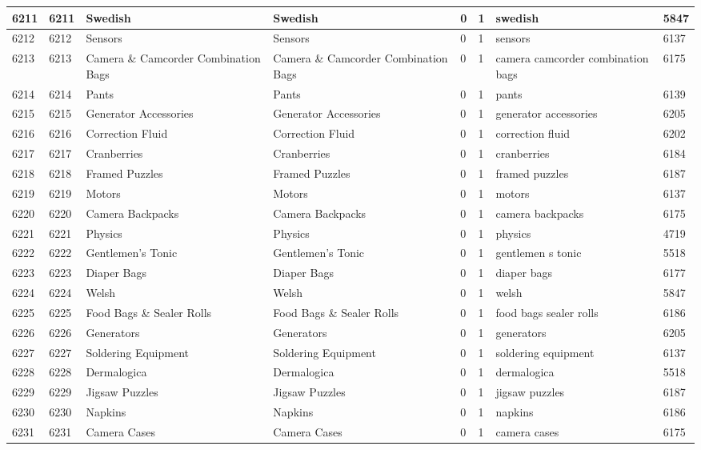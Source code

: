 \begin{longtable}{|l|l|l|l|l|l|l|l|}
6211 & 6211 & Swedish & Swedish & 0 & 1 & swedish & 5847 \\ \hline 
6212 & 6212 & Sensors & Sensors & 0 & 1 & sensors & 6137 \\ \hline 
6213 & 6213 & Camera \& Camcorder Combination Bags & Camera \& Camcorder Combination Bags & 0 & 1 & camera camcorder combination bags & 6175 \\ \hline 
6214 & 6214 & Pants & Pants & 0 & 1 & pants & 6139 \\ \hline 
6215 & 6215 & Generator Accessories & Generator Accessories & 0 & 1 & generator accessories & 6205 \\ \hline 
6216 & 6216 & Correction Fluid & Correction Fluid & 0 & 1 & correction fluid & 6202 \\ \hline 
6217 & 6217 & Cranberries & Cranberries & 0 & 1 & cranberries & 6184 \\ \hline 
6218 & 6218 & Framed Puzzles & Framed Puzzles & 0 & 1 & framed puzzles & 6187 \\ \hline 
6219 & 6219 & Motors & Motors & 0 & 1 & motors & 6137 \\ \hline 
6220 & 6220 & Camera Backpacks & Camera Backpacks & 0 & 1 & camera backpacks & 6175 \\ \hline 
6221 & 6221 & Physics & Physics & 0 & 1 & physics & 4719 \\ \hline 
6222 & 6222 & Gentlemen's Tonic & Gentlemen's Tonic & 0 & 1 & gentlemen s tonic & 5518 \\ \hline 
6223 & 6223 & Diaper Bags & Diaper Bags & 0 & 1 & diaper bags & 6177 \\ \hline 
6224 & 6224 & Welsh & Welsh & 0 & 1 & welsh & 5847 \\ \hline 
6225 & 6225 & Food Bags \& Sealer Rolls & Food Bags \& Sealer Rolls & 0 & 1 & food bags sealer rolls & 6186 \\ \hline 
6226 & 6226 & Generators & Generators & 0 & 1 & generators & 6205 \\ \hline 
6227 & 6227 & Soldering Equipment & Soldering Equipment & 0 & 1 & soldering equipment & 6137 \\ \hline 
6228 & 6228 & Dermalogica & Dermalogica & 0 & 1 & dermalogica & 5518 \\ \hline 
6229 & 6229 & Jigsaw Puzzles & Jigsaw Puzzles & 0 & 1 & jigsaw puzzles & 6187 \\ \hline 
6230 & 6230 & Napkins & Napkins & 0 & 1 & napkins & 6186 \\ \hline 
6231 & 6231 & Camera Cases & Camera Cases & 0 & 1 & camera cases & 6175 \\ \hline 

\end{longtable}
